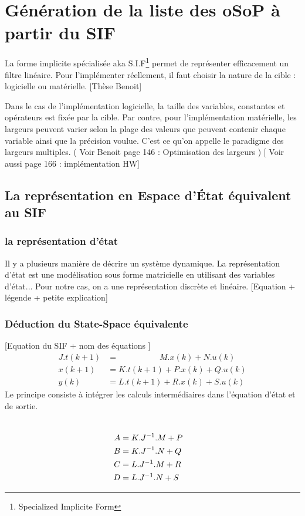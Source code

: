 \chapter{Génération de la liste des oSoP à partir du SIF}

La forme implicite spécialisée aka S.I.F\footnote{Specialized Implicite Form} permet de représenter efficacement un filtre linéaire. Pour l'implémenter réellement, il faut choisir la nature de la cible : logicielle ou matérielle. [Thèse Benoit]


Dans le cas de l'implémentation logicielle, la taille des variables, constantes et opérateurs est fixée par la cible. 
Par contre, pour l'implémentation matérielle, les largeurs peuvent varier selon la plage des valeurs que peuvent contenir chaque variable ainsi que la précision voulue. C'est ce qu'on appelle le paradigme des largeurs multiples. ( Voir Benoit page 146 : Optimisation des largeurs )
[ Voir aussi page 166 : implémentation HW]


\section{La représentation en Espace d'État équivalent au SIF}
\subsection{la représentation d'état}
Il y a plusieurs manière de décrire un système dynamique. La représentation d'état est une modélisation sous forme matricielle en utilisant des variables d'état... Pour notre cas, on a une représentation discrète et linéaire.
[Equation + légende + petite explication]

\subsection{Déduction du State-Space équivalente}
[Equation du SIF + nom des équations ]
\begin{align*}
J.t(k+1) &= \qquad \qquad \quad M.x(k) + N.u(k) \\
x(k+1) &= K.t(k+1) + P.x(k) + Q.u(k) \\
y(k) &= L.t(k+1) + R.x(k) + S.u(k)
\end{align*}
Le principe consiste à intégrer les calculs intermédiaires dans l'équation d'état et de sortie. 

\begin{align*}
[calculs] \\
\smallskip
A &= K.J^{-1}.M + P \\
B &= K.J^{-1}.N + Q \\
C &= L.J^{-1}.M + R \\
D &= L.J^{-1}.N + S
\end{align*}


